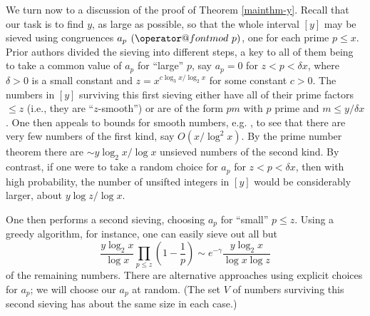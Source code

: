 \documentclass[12pt]{amsart}
\makeatletter
\numberwithin{equation}{section}  %
\theoremstyle{remark}
\theoremstyle{plain}
\newtheorem{thm}{Theorem}
\numberwithin{equation}{section}
\renewcommand{\pmod}[1]{\allowbreak\mkern7mu({\operator@font mod}\,\,#1)}
\newcommand{\del}{\ensuremath{\delta}}
\renewcommand{\le}{\leqslant}
\renewcommand{\leq}{\leqslant}
\renewcommand{\ge}{\geqslant}
\renewcommand{\(}{\left(}
\renewcommand{\)}{\right)}
\newcommand{\asym}{\sim}   %
\makeatother
\begin{document}
\begin{comment} %
Theorem~\ref{mainthm} immediately follows from the following lemma about
Jacobsthal's function.

\begin{thm}\label{mainlem}
 For any $R>0$ and for sufficiently large $x$
there are
$$\ge R\frac{x \log x \log_3 x}{(\log_2 x)^2}$$
consecutive integers, each having a prime divisor not exceeding $x$.
Consequently, by taking $n=n_x$ to be the product of primes $\le x$,
\[
J(x) \ge f(x) \frac{\log x \log_2 x \log_4 x}{(\log_3 x)^2},
\]
where $f(x)\to \infty$ as $x\to \infty$.
\end{thm}

Proving Theorem \ref{mainlem} is accomplished by selecting a residue class
$a_p\pmod{p}$ for each prime $p\le x$, which together ``sieve out'' 
all of the numbers $[y]$ (that is, every positive integer 
$\le y$ lies in one of the residue classes), where
$$y> R\frac{x \log x \log_3 x}{(\log_2 x)^2}.$$
Taking $m$ to be a positive integer such that
 $m\equiv -a_p\pmod{p}$ for all $p$, we see that the numbers
 $m+1,\ldots,m+y$ are each divisible by a prime $\le x$.
 \end{comment} %

We turn now to a discussion of the proof of Theorem \ref{mainthm-y}. Recall that our task is to find $y$, as large as possible, so that the whole interval $[y]$ may be sieved using congruences $a_p \pmod{p}$, one for each prime $p \leq x$. Prior authors divided the sieving into different steps, a key to all of
them being to take a common value of $a_p$ for ``large'' $p$,
say $a_p=0$ for $z<p<\del x$, where $\delta>0$ is a small constant and $z=x^{c\log_3 x/\log_2 x}$ for
some constant $c>0$.
The numbers
in $[y]$ surviving this first sieving either have all of their prime factors 
$\le z$ (i.e., they are ``$z$-smooth'') or are of the form $pm$ with $p$ prime
and $m\le y/\del x$.  One then appeals
to bounds for smooth numbers, e.g. \cite{deB},
to see that there are very few numbers of the first kind, say $O(x/\log^2 x)$.
By the prime number theorem there are
 $\asym y\log_2 x/\log x$ unsieved numbers of the second kind.
By contrast, if one were to take a random choice for $a_p$ for 
$z<p<\del x$, then with high probability, the number of unsifted integers
in $[y]$ would be considerably larger, about
$y\log z/\log x$.

One then performs a second sieving, choosing $a_p$ for ``small'' $p\le z$. 
Using a greedy algorithm, for instance, one can easily sieve out all but
\[
\frac{y\log_2 x}{\log x} \prod_{p\le z} \(1-\frac{1}{p}\) \asym
e^{-\gamma} \frac{y\log_2 x}{\log x \log z}
\]
of the remaining numbers.  There are alternative approaches using explicit
choices for $a_p$; we will choose our $a_p$ at random.  (The set $V$ of numbers surviving this second sieving has about the same size in each case.)
\end{document}

